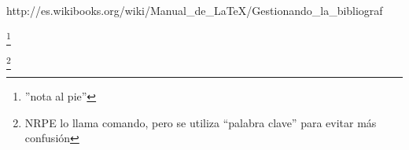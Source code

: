 http://es.wikibooks.org/wiki/Manual_de_LaTeX/Gestionando_la_bibliograf%

\footnote[''marca'']{''nota al pie''}

\footnote[1]{NRPE lo llama comando, pero se utiliza ``palabra clave'' para evitar más confusión}
